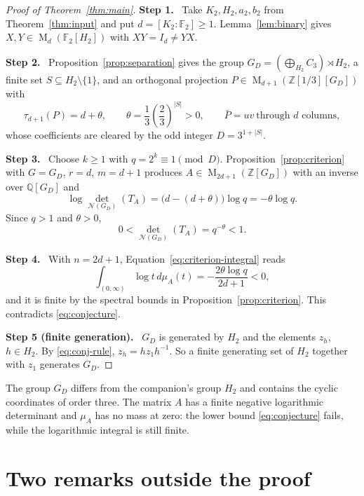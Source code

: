 \documentclass[11pt]{article}
\theoremstyle{remark}
\numberwithin{equation}{section}
\newcommand{\F}{\mathbb F}
\newcommand{\Z}{\mathbb Z}
\newcommand{\Q}{\mathbb Q}
\newcommand{\Mat}{\operatorname{M}}
\newcommand{\N}{\mathcal N}
\newcommand{\step}[1]{\par\smallskip\noindent\textbf{Step #1.}\ }
\begin{document}
\begin{proof}[Proof of Theorem~\ref{thm:main}]
\step{1} Take $K_2,H_2,a_2,b_2$ from Theorem~\ref{thm:input} and put $d=[K_2:\F_2]\ge1$. Lemma~\ref{lem:binary} gives $X,Y\in\Mat_d(\F_2[H_2])$ with $XY=I_d\ne YX$.

\step{2} Proposition~\ref{prop:separation} gives the group $G_D=(\bigoplus_{H_2}C_3)\rtimes H_2$, a finite set $S\subseteq H_2\setminus\{1\}$, and an orthogonal projection $P\in\Mat_{d+1}(\Z[1/3][G_D])$ with
\[
 \tau_{d+1}(P)=d+\theta,\qquad\theta=\frac13\left(\frac23\right)^{|S|}>0,\qquad \bar P=uv\ \text{through $d$ columns},
\]
whose coefficients are cleared by the odd integer $D=3^{1+|S|}$.

\step{3} Choose $k\ge1$ with $q=2^k\equiv1\pmod D$. Proposition~\ref{prop:criterion} with $G=G_D$, $r=d$, $m=d+1$ produces $A\in\Mat_{2d+1}(\Z[G_D])$ with an inverse over $\Q[G_D]$ and
\[
 \log\det_{\N(G_D)}(T_A)=\bigl(d-(d+\theta)\bigr)\log q=-\theta\log q.
\]
Since $q>1$ and $\theta>0$,
\begin{equation}\label{eq:final-det}
 0<\det_{\N(G_D)}(T_A)=q^{-\theta}<1.
\end{equation}

\step{4} With $n=2d+1$, Equation~\eqref{eq:criterion-integral} reads
\begin{equation}\label{eq:final-integral}
 \int_{(0,\infty)}\log t\,d\mu_A(t)
 =-\frac{2\theta\log q}{2d+1}<0,
\end{equation}
and it is finite by the spectral bounds in Proposition~\ref{prop:criterion}. This contradicts \eqref{eq:conjecture}.

\step{5 (finite generation)} $G_D$ is generated by $H_2$ and the elements $z_h$, $h\in H_2$. By \eqref{eq:conj-rule}, $z_h=hz_1h^{-1}$. So a finite generating set of $H_2$ together with $z_1$ generates $G_D$.
\end{proof}

The group $G_D$ differs from the companion's group $H_2$ and contains the cyclic coordinates of order three. The matrix $A$ has a finite negative logarithmic determinant and $\mu_A$ has no mass at zero: the lower bound \eqref{eq:conjecture} fails, while the logarithmic integral is still finite.

\section{Two remarks outside the proof}
\end{document}
